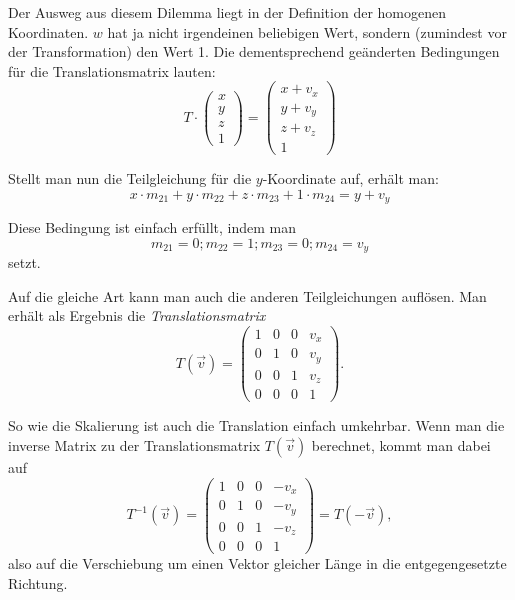Der Ausweg aus diesem Dilemma liegt in der Definition der homogenen Koordinaten. $w$ hat ja nicht irgendeinen beliebigen Wert, sondern (zumindest vor der Transformation) den Wert 1. Die dementsprechend geänderten Bedingungen für die Translationsmatrix lauten:
\begin{equation}
 T \cdot 
 \begin{pmatrix}
  x \\
  y \\
  z \\
  1
 \end{pmatrix}
 =
 \begin{pmatrix}
  x + v_x \\
  y + v_y \\
  z + v_z \\
  1
 \end{pmatrix}
\end{equation}

Stellt man nun die Teilgleichung für die $y$-Koordinate auf, erhält man:
\begin{equation}
 x \cdot m_{21} + y \cdot m_{22} + z \cdot m_{23} + 1 \cdot m_{24} = y + v_y
\end{equation}

Diese Bedingung ist einfach erfüllt, indem man
\begin{equation}
 m_{21} = 0; m_{22} = 1; m_{23} = 0; m_{24} = v_y
\end{equation}
setzt.

Auf die gleiche Art kann man auch die anderen Teilgleichungen auflösen. Man erhält als Ergebnis die \emph{Translationsmatrix}
\begin{equation}
 T{(\vec v)} =
 \begin{pmatrix}
  1 & 0 & 0 & v_x \\
  0 & 1 & 0 & v_y \\
  0 & 0 & 1 & v_z \\
  0 & 0 & 0 & 1
 \end{pmatrix}.
\end{equation}

So wie die Skalierung ist auch die Translation einfach umkehrbar. Wenn man die inverse Matrix zu der Translationsmatrix $T{(\vec v)}$ berechnet, kommt man dabei auf
\begin{equation}
 T^{-1}{(\vec v)} =
 \begin{pmatrix}
  1 & 0 & 0 & -v_x \\
  0 & 1 & 0 & -v_y \\
  0 & 0 & 1 & -v_z \\
  0 & 0 & 0 & 1
 \end{pmatrix} = T{(-\vec v)},
\end{equation}
also auf die Verschiebung um einen Vektor gleicher Länge in die entgegengesetzte Richtung.

